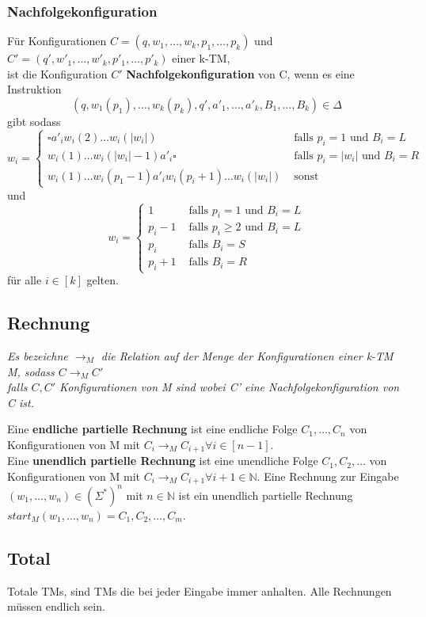 \documentclass[DIV=15]{scrartcl}
\begin{document}
\subsubsection{Nachfolgekonfiguration}
    Für Konfigurationen \(C=(q,w_1,\dots,w_k,p_1,\dots,p_k)\) und \(C'=(q',w'_1,\dots,w'_k,p'_1,\dots,p'_k)\) einer k-TM, \\
    ist die Konfiguration \(C'\) \textbf{Nachfolgekonfiguration} von C, wenn es eine Instruktion 
    \[(q,w_1(p_1),\dots,w_k(p_k),q',a'_1,\dots,a'_k,B_1,\dots,B_k)\in\Delta\] 
    gibt sodass
    \[
    w_i = \begin{cases}
        \square a'_iw_i(2)\dots w_i(|w_i|) & \text{ falls } p_i=1 \text{ und } B_i=L\\
        w_i(1)\dots w_i(|w_i|-1)a'_i\square & \text{ falls } p_i=|w_i| \text{ und } B_i = R\\
        w_i(1)\dots w_i(p_1-1)a'_iw_i(p_i+1)\dots w_i(|w_i|) & \text{ sonst}
    \end{cases}    
    \]
    und 
    \[
    w_i = \begin{cases}
        1 & \text{ falls } p_i=1 \text{ und } B_i=L\\
        p_i-1 & \text{ falls } p_i \geq 2 \text{ und } B_i = L\\
        p_i & \text{ falls } B_i=S\\
        p_i+1 & \text{ falls } B_i=R
    \end{cases}    
    \]
    für alle \(i\in [k]\) gelten.
\subsection{Rechnung}
    \textit{Es bezeichne \(\to _M\) die Relation auf der Menge der Konfigurationen einer k-TM M, sodass \(C\to _M C'\) \\
    falls \(C,C'\) Konfigurationen von M sind wobei C' eine Nachfolgekonfiguration von C ist.} \par\bigskip
    Eine \textbf{endliche partielle Rechnung} ist eine endliche Folge \(C_1,\dots,C_n\) von Konfigurationen von 
    M mit \(C_i\to _M C_{i+1}\forall i\in[n-1]\).\\
    Eine \textbf{unendlich partielle Rechnung} ist eine unendliche Folge \(C_1,C_2,\dots\) von Konfigurationen von 
    M mit \(C_i\to _M C_{i+1}\forall i+1\in\mathbb{N}\).
    Eine Rechnung zur Eingabe \((w_1,\dots,w_n)\in(\Sigma^*)^n\) mit \(n\in \mathbb{N}\) ist ein 
    unendlich partielle Rechnung \(start_M(w_1,\dots,w_n)=C_1,C_2,\dots,C_m\).
\subsection{Total}
    Totale TMs, sind TMs die bei jeder Eingabe immer anhalten. Alle Rechnungen müssen endlich sein.
\end{document}
